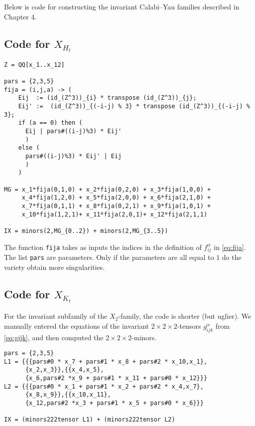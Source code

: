 Below is \MM code for constructing the invariant Calabi--Yau families described in Chapter 4.

\subsection{Code for $X_{H_t}$}

\begin{lstlisting}[caption=Code for $X_{H_t}$, language=Macaulay2]
Z = QQ[x_1..x_12]

pars = {2,3,5}
fija = (i,j,a) -> (
    Eij  := (id_(Z^3))_{i} * transpose (id_(Z^3))_{j};
    Eij' :=  (id_(Z^3))_{(-i-j) % 3} * transpose (id_(Z^3))_{(-i-j) % 3};
    if (a == 0) then (
      Eij | pars#((i-j)%3) * Eij'
      )
    else (
      pars#((i-j)%3) * Eij' | Eij
      )
    )

MG = x_1*fija(0,1,0) + x_2*fija(0,2,0) + x_3*fija(1,0,0) + 
     x_4*fija(1,2,0) + x_5*fija(2,0,0) + x_6*fija(2,1,0) +
     x_7*fija(0,1,1) + x_8*fija(0,2,1) + x_9*fija(1,0,1) +
     x_10*fija(1,2,1)+ x_11*fija(2,0,1)+ x_12*fija(2,1,1)

IX = minors(2,MG_{0..2}) + minors(2,MG_{3..5})
\end{lstlisting}

The function \texttt{fija} takes as inputs the indices in the definition of $f_{ij}^\alpha$ in \cref{eq:fija}. The list \texttt{pars} are parameters. Only if the parameters are all equal to $1$ do the variety obtain more singularities.

\subsection{Code for $X_{K_t}$}
{}
For the invariant subfamily of the $X_2$-family, the code is shorter (but uglier). We manually entered the equations of the invariant $2 \times 2 \times 2$-tensors $g_{ijk}^\alpha$ from \cref{eq:gijk}, and then computed the $2 \times 2 \times 2$-minors.

\begin{lstlisting}[caption=Code for $X_{K_t}$, language=Macaulay2]
pars = {2,3,5}
L1 = {{{pars#0 * x_7 + pars#1 * x_8 + pars#2 * x_10,x_1},
      {x_2,x_3}},{{x_4,x_5},
      {x_6,pars#2 *x_9 + pars#1 * x_11 + pars#0 * x_12}}}
L2 = {{{pars#0 * x_1 + pars#1 * x_2 + pars#2 * x_4,x_7},
      {x_8,x_9}},{{x_10,x_11},
      {x_12,pars#2 *x_3 + pars#1 * x_5 + pars#0 * x_6}}}

IX = (minors222tensor L1) + (minors222tensor L2)
\end{lstlisting}